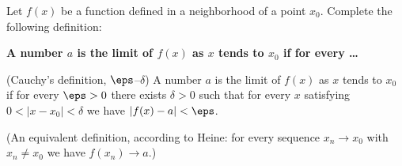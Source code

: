 
\begin{question}
Let $f(x)$ be a function defined in a neighborhood of a point $x_0$. Complete the following definition:

\textbf{A number $a$ is the limit of $f(x)$ as $x$ tends to $x_0$ if for every \ldots}
\end{question}

\begin{solution}
(Cauchy's definition, $\eps$--$\delta$) A number $a$ is the limit of $f(x)$ as $x$ tends to $x_0$ if for every $\eps>0$ there exists $\delta>0$ such that for every $x$ satisfying $0<|x-x_0|<\delta$ we have $|f(x)-a|<\eps$.

(An equivalent definition, according to Heine: for every sequence $x_n\to x_0$ with $x_n\neq x_0$ we have $f(x_n)\to a$.)
\end{solution}
